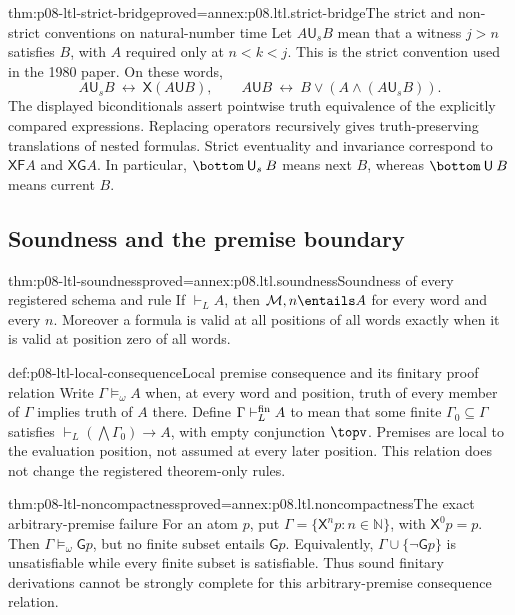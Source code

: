 \begin{hbtheorem}{thm:p08-ltl-strict-bridge}{proved=annex:p08.ltl.strict-bridge}{The strict and non-strict conventions on natural-number time}
Let \(A\mathbin{\mathsf U_s}B\) mean that a witness \(j>n\)
satisfies \(B\), with \(A\) required only at \(n<k<j\).
This is the strict convention used in the 1980 paper. On these words,
\[
 A\mathbin{\mathsf U_s}B\ \leftrightarrow\
 \mathsf X(A\mathbin{\mathsf U}B),\qquad
 A\mathbin{\mathsf U}B\ \leftrightarrow\
 B\lor(A\land(A\mathbin{\mathsf U_s}B)).
\]
The displayed biconditionals assert pointwise truth equivalence
of the explicitly compared expressions. Replacing operators
recursively gives truth-preserving translations of nested formulas.
Strict eventuality and invariance correspond to
\(\mathsf X\mathsf F A\) and \(\mathsf X\mathsf G A\).
In particular, \(\bottom\mathbin{\mathsf U_s}B\) means next \(B\),
whereas \(\bottom\mathbin{\mathsf U}B\) means current \(B\).
\end{hbtheorem}

\subsection{Soundness and the premise boundary}
\label{sec:p08-ltl-soundness-boundary}

\begin{hbtheorem}{thm:p08-ltl-soundness}{proved=annex:p08.ltl.soundness}{Soundness of every registered schema and rule}
If \(\vdash_L A\), then \(\mathcal M,n\entails A\) for every
word and every \(n\). Moreover a formula is valid at all positions
of all words exactly when it is valid at position zero of all words.
\end{hbtheorem}

\begin{hbdefinition}{def:p08-ltl-local-consequence}{Local premise consequence and its finitary proof relation}
Write \(\Gamma\models_\omega A\) when, at every word and position,
truth of every member of \(\Gamma\) implies truth of \(A\) there.
Define \(\Gamma\vdash_L^{\rm fin}A\) to mean that some finite
\(\Gamma_0\subseteq\Gamma\) satisfies
\(\vdash_L(\bigwedge\Gamma_0)\to A\), with empty conjunction
\(\topv\). Premises are local to the evaluation position, not
assumed at every later position. This relation does not change
the registered theorem-only rules.
\end{hbdefinition}

\begin{hbtheorem}{thm:p08-ltl-noncompactness}{proved=annex:p08.ltl.noncompactness}{The exact arbitrary-premise failure}
For an atom \(p\), put
\(\Gamma=\{\mathsf X^n p:n\in\mathbb N\}\), with
\(\mathsf X^0p=p\). Then \(\Gamma\models_\omega\mathsf Gp\),
but no finite subset entails \(\mathsf Gp\). Equivalently,
\(\Gamma\cup\{\neg\mathsf Gp\}\) is unsatisfiable while every
finite subset is satisfiable. Thus sound finitary derivations cannot
be strongly complete for this arbitrary-premise consequence relation.
\end{hbtheorem}

